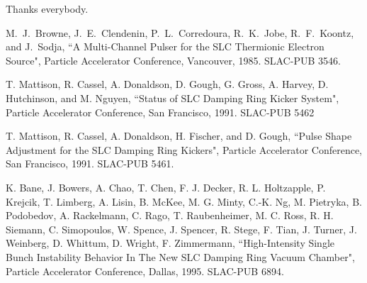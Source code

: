 \documentclass[aps,prl,preprint,groupedaddress]{revtex4-1}
\begin{document}

\begin{acknowledgments}
Thanks everybody.
\end{acknowledgments}

\begin{thebibliography}{9}
% 
  M.~J.~Browne, J.~E.~Clendenin, P.~L.~Corredoura, R.~K.~Jobe, R.~F.~Koontz, and J.~Sodja, 
  ``A Multi-Channel Pulser for the SLC Thermionic Electron Source", 
  Particle Accelerator Conference, Vancouver, 1985. 
  SLAC-PUB 3546.
  
  T. Mattison, R. Cassel, A. Donaldson, D. Gough, G. Gross, A. Harvey, D. Hutchinson, and M. Nguyen,
  ``Status of SLC Damping Ring Kicker System",
  Particle Accelerator Conference, San Francisco, 1991.
  SLAC-PUB 5462
  
  T. Mattison, R. Cassel, A. Donaldson, H. Fischer, and D. Gough,
  ``Pulse Shape Adjustment for the SLC Damping Ring Kickers",
  Particle Accelerator Conference, San Francisco, 1991.
  SLAC-PUB 5461.
  
  K. Bane, J. Bowers, A. Chao, T. Chen, F. J. Decker, R. L. Holtzapple, P. Krejcik, T. Limberg, A. Lisin, B. McKee, M. G. Minty, C.-K. Ng, M. Pietryka, B. Podobedov, A. Rackelmann, C. Rago, T. Raubenheimer, M. C. Ross, R. H. Siemann, C. Simopoulos, W. Spence, J. Spencer, R. Stege, F. Tian, J. Turner, J. Weinberg, D. Whittum, D. Wright, F. Zimmermann,
  ``High-Intensity Single Bunch Instability Behavior In The New SLC Damping Ring Vacuum Chamber",
  Particle Accelerator Conference, Dallas, 1995.
  SLAC-PUB 6894.
    
\end{thebibliography}
\end{document}
